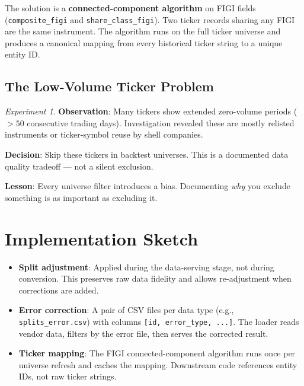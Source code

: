 \documentclass[a4paper, 11pt]{report}
\theoremstyle{definition}
\theoremstyle{remark}
\newtheorem{experiment}{Experiment}[chapter]
\begin{document}
The solution is a \textbf{connected-component algorithm} on FIGI fields
(\texttt{composite\_figi} and \texttt{share\_class\_figi}).  Two ticker records
sharing any FIGI are the same instrument.  The algorithm runs on the full ticker
universe and produces a canonical mapping from every historical ticker string to
a unique entity ID\@.

\subsection{The Low-Volume Ticker Problem}

\begin{experiment}
    \textbf{Observation}: Many tickers show extended zero-volume periods
    ($>50$ consecutive trading days).  Investigation revealed these are mostly
    relisted instruments or ticker-symbol reuse by shell companies.

    \textbf{Decision}: Skip these tickers in backtest universes.  This is a
    documented data quality tradeoff --- not a silent exclusion.

    \textbf{Lesson}: Every universe filter introduces a bias.  Documenting
    \emph{why} you exclude something is as important as excluding it.
\end{experiment}

\section{Implementation Sketch}

\begin{itemize}
    \item \textbf{Split adjustment}: Applied during the data-serving stage, not
          during conversion.  This preserves raw data fidelity and allows
          re-adjustment when corrections are added.
    \item \textbf{Error correction}: A pair of CSV files per data type
          (e.g., \texttt{splits\_error.csv}) with columns
          \texttt{[id, error\_type, ...]}.  The loader reads vendor data, filters
          by the error file, then serves the corrected result.
    \item \textbf{Ticker mapping}: The FIGI connected-component algorithm runs
          once per universe refresh and caches the mapping.  Downstream code
          references entity IDs, not raw ticker strings.
\end{itemize}
\end{document}
